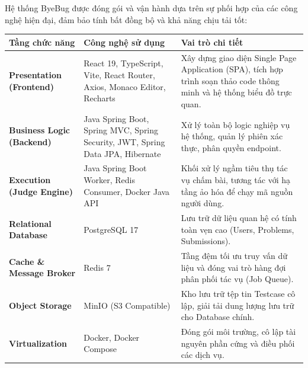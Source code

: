 \documentclass[12pt,a4paper]{article}
\renewcommand{\_}{\BreakableUnderscore}
\begin{document}
Hệ thống ByeBug được đóng gói và vận hành dựa trên sự phối hợp của các công nghệ hiện đại, đảm bảo tính bất đồng bộ và khả năng chịu tải tốt:

\begin{longtable}[]{
  |>{\raggedright\arraybackslash}p{}
  |>{\raggedright\arraybackslash}p{}
  |>{\raggedright\arraybackslash}p{}|}
\hline\rowcolor{tableHeader}
\begin{minipage}[b]{\linewidth}\raggedright
Tầng chức năng
\end{minipage} & \begin{minipage}[b]{\linewidth}\raggedright
Công nghệ sử dụng
\end{minipage} & \begin{minipage}[b]{\linewidth}\raggedright
Vai trò chi tiết
\end{minipage} \\
\hline
\endhead
\hline
\endlastfoot
\textbf{Presentation (Frontend)} & React 19, TypeScript, Vite, React Router, Axios, Monaco Editor, Recharts & Xây dựng giao diện Single Page Application (SPA), tích hợp trình soạn thảo code thông minh và hệ thống biểu đồ trực quan. \\
\hline
\textbf{Business Logic (Backend)} & Java Spring Boot, Spring MVC, Spring Security, JWT, Spring Data JPA, Hibernate & Xử lý toàn bộ logic nghiệp vụ hệ thống, quản lý phiên xác thực, phân quyền endpoint. \\
\hline
\textbf{Execution (Judge Engine)} & Java Spring Boot Worker, Redis Consumer, Docker Java API & Khối xử lý ngầm tiêu thụ tác vụ chấm bài, tương tác với hạ tầng ảo hóa để chạy mã nguồn người dùng. \\
\hline
\textbf{Relational Database} & PostgreSQL 17 & Lưu trữ dữ liệu quan hệ có tính toàn vẹn cao (Users, Problems, Submissions). \\
\hline
\textbf{Cache \& Message Broker} & Redis 7 & Tầng đệm tối ưu truy vấn dữ liệu và đóng vai trò hàng đợi phân phối tác vụ (Job Queue). \\
\hline
\textbf{Object Storage} & MinIO (S3 Compatible) & Kho lưu trữ tệp tin Testcase cô lập, giải tải dung lượng lưu trữ cho Database chính. \\
\hline
\textbf{Virtualization} & Docker, Docker Compose & Đóng gói môi trường, cô lập tài nguyên phần cứng và điều phối các dịch vụ. \\
\hline
\end{longtable}
\end{document}

